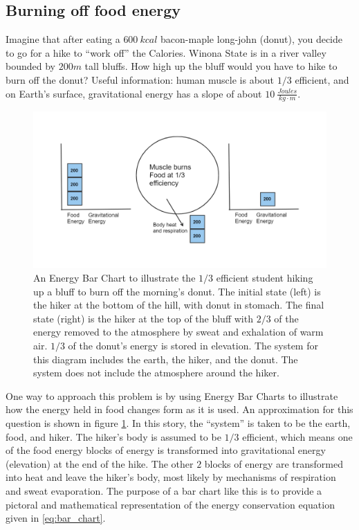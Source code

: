 \documentclass[12pt]{iopart}
\begin{document}
\subsection{Burning off food energy}
Imagine that after eating a $600~kcal$ bacon-maple long-john (donut), you decide to go for a hike to ``work off'' the Calories.  Winona State  is in a river valley bounded by $200m$ tall bluffs.  How high up the bluff would you have to hike to burn off the donut?  
Useful information: human muscle is about $1/3$ efficient, and on Earth's surface, gravitational energy has a slope of about $10~\frac{Joules}{kg\cdot m}$.

\begin{figure}[h]
\centering
\includegraphics[width=\columnwidth]{bar_chart.png}
\caption{An Energy Bar Chart to illustrate the $1/3$ efficient student hiking up a bluff to burn off the morning's donut.  The initial state (left) is the hiker at the bottom of the hill, with donut in stomach.  The final state (right) is the hiker at the top of the bluff with $2/3$ of the energy removed to the atmosphere by sweat and exhalation of warm air. $1/3$ of the donut's energy is stored in elevation.  The system for this diagram includes the earth, the hiker, and the donut.  The system does not include the atmosphere around the hiker.  
}
\label{bar_chart}
\end{figure}

One way to approach this problem is by using Energy Bar Charts \cite{energy_bar_charts} to illustrate how the energy held in food changes form as it is used.  An approximation for this question is shown in figure \ref{bar_chart}.  
In this story, the ``system'' is taken to be the earth, food, and hiker.  The hiker's body is assumed to be $1/3$ efficient, which means one of the food energy blocks of energy is transformed into gravitational energy (elevation) at the end of the hike.  
The other $2$ blocks of energy are transformed into heat and leave the hiker's body, most likely by mechanisms of respiration and sweat evaporation. The purpose of a bar chart like this is to provide a pictoral and mathematical representation of the energy conservation equation given in \ref{eq:bar_chart}.         
\end{document}
